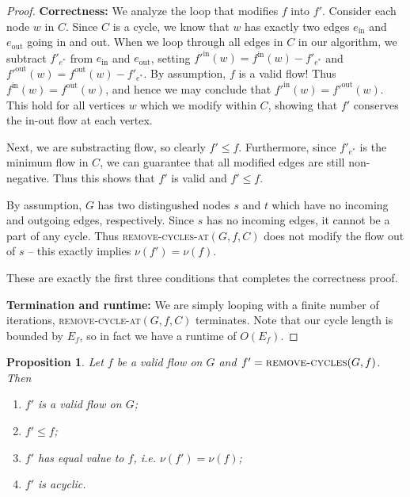 \documentclass[10pt]{article}
\newtheorem{proposition}[lemma]{Proposition}
\begin{document}
\begin{proof}
  \textbf{Correctness:} We analyze the loop that modifies \(f\) into \(f'\). Consider each node \(w\) in \(C\). Since \(C\) is a cycle, we know that \(w\) has exactly two edges \(e_{\text{in}}\) and \(e_{\text{out}}\) going in and out. When we loop through all edges in \(C\) in our algorithm, we subtract \(f'_{e^*}\) from \(e_{\text{in}}\) and \(e_{\text{out}}\), setting \(f'^{\text{in}}(w) = f^{\text{in}}(w) - f'_{e^*}\) and \(f'^{\text{out}}(w) = f^{\text{out}}(w) - f'_{e^*}\). By assumption, \(f\) is a valid flow! Thus \(f^{\text{in}}(w) = f^{\text{out}}(w)\), and hence we may conclude that \(f'^{\text{in}}(w) = f'^{\text{out}}(w)\). This hold for all vertices \(w\) which we modify within \(C\), showing that \(f'\) conserves the in-out flow at each vertex. 
  
  Next, we are substracting flow, so clearly \(f' \leq f\). Furthermore, since \(f'_{e^*}\) is the minimum flow in \(C\), we can guarantee that all modified edges are still non-negative. Thus this shows that \(f'\) is valid and \(f' \leq f\).

  By assumption, \(G\) has two distingushed nodes \(s\) and \(t\) which have no incoming and outgoing edges, respectively. Since \(s\) has no incoming edges, it cannot be a part of any cycle. Thus \textsc{remove-cycles-at}\((G, f, C)\) does not modify the flow out of \(s\) -- this exactly implies \(\nu(f') = \nu(f)\).
  
  These are exactly the first three conditions that completes the correctness proof.
  
  \textbf{Termination and runtime:} We are simply looping with a finite number of iterations, \textsc{remove-cycle-at}\((G, f, C)\) terminates. Note that our cycle length is bounded by \(E_f\), so in fact we have a runtime of \(O(E_f)\).
\end{proof}

\begin{proposition}
  Let \(f\) be a valid flow on \(G\) and \(f' = \textsc{remove-cycles}(G, f)\). Then 
  \begin{enumerate}
    \item \(f'\) is a valid flow on \(G\);
    \item \(f' \le f\);
    \item \(f'\) has equal value to \(f\), i.e. \(\nu(f') = \nu(f)\);
    \item \(f'\) is acyclic.
  \end{enumerate}
\end{proposition}
\end{document}
